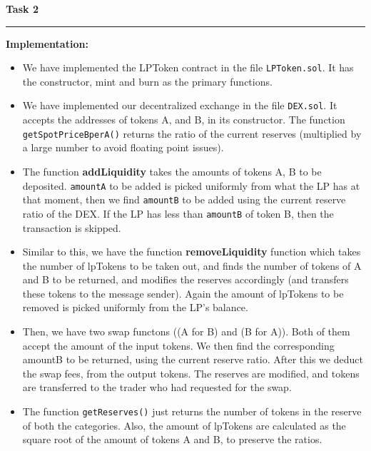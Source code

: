 \documentclass[a4paper]{article}
\newenvironment{solution}[2][]{%
\begin{mdframed}[linecolor=blue!70!black, linewidth=2pt, roundcorner=10pt, backgroundcolor=yellow!10!white, skipabove=12pt, skipbelow=12pt]%
	\textbf{\large #2}
	\par\noindent\rule{\textwidth}{0.4pt}
}{
\end{mdframed}
}
\begin{document}
\begin{solution}{Task 2}
	\textbf{Implementation:}
	\begin{itemize}
		\item We have implemented the LPToken contract in the file \texttt{LPToken.sol}. It has the constructor, mint and burn as the primary functions. 
		\item We have implemented our decentralized exchange in the file \texttt{DEX.sol}. It accepts the addresses of tokens A, and B, in its constructor. The function \texttt{getSpotPriceBperA()} returns the ratio of the current reserves (multiplied by a large number to avoid floating point issues). 
		\item The function \textbf{addLiquidity} takes the amounts of tokens A, B to be deposited. \texttt{amountA} to be added is picked uniformly from what the LP has at that moment, then we find \texttt{amountB} to be added using the current reserve ratio of the DEX. If the LP has less than \texttt{amountB} of token B, then the transaction is skipped.
		\item Similar to this, we have the function \textbf{removeLiquidity} function which takes the number of lpTokens to be taken out, and finds the number of tokens of A and B to be returned, and modifies the reserves accordingly (and transfers these tokens to the message sender). Again the amount of lpTokens to be removed is picked uniformly from the LP's balance.
		\item Then, we have two swap functons ((A for B) and (B for A)). Both of them accept the amount of the input tokens. We then find the corresponding amountB to be returned, using the current reserve ratio. After this we deduct the swap fees, from the output tokens. The reserves are modified, and tokens are transferred to the trader who had requested for the swap.
		\item The function \texttt{getReserves()} just returns the number of tokens in the reserve of both the categories. Also, the amount of lpTokens are calculated as the square root of the amount of tokens A and B, to preserve the ratios.
	\end{itemize}
	

\end{solution}
\end{document}
